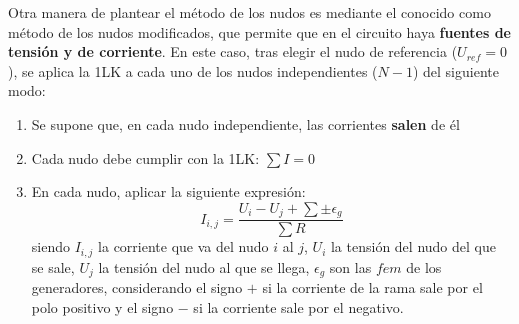 	Otra manera de plantear el método de los nudos es mediante el conocido como método de los nudos modificados, que permite que en el circuito haya \textbf{fuentes de tensión y de corriente}. En este caso, tras elegir el nudo de referencia ($U_{ref}=0$), se aplica la 1LK a cada uno de los nudos independientes ($N-1$) del siguiente modo:
	\begin{enumerate}
	    \item Se supone que, en cada nudo independiente, las corrientes \textbf{salen} de él
	    \item Cada nudo debe cumplir con la 1LK: $\sum I=0$
	    \item En cada nudo, aplicar la siguiente expresión:
	    \begin{equation*}
	        I_{i,j}=\dfrac{U_i-U_j+\sum\pm \epsilon_g}{\sum R}
	    \end{equation*}
	    siendo $I_{i,j}$ la corriente que va del nudo $i$ al $j$, $U_i$ la tensión del nudo del que se sale, $U_j$ la tensión del nudo al que se llega, $\epsilon_g$ son las $fem$ de los generadores, considerando el signo $+$ si la corriente de la rama sale por el polo positivo y el signo $-$ si la corriente sale por el negativo.
	\end{enumerate}
	

